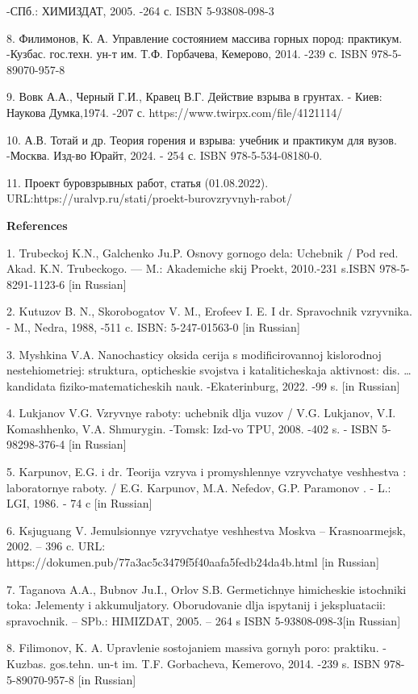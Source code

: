 -СПб.: ХИМИЗДАТ, 2005. -264 с. ISBN 5-93808-098-3

8. Филимонов, К. А. Управление состоянием массива горных пород:
практикум. -Кузбас. гос.техн. ун-т им. Т.Ф. Горбачева, Кемерово, 2014.
-239 с. ISBN 978-5-89070-957-8

9. Вовк А.А., Черный Г.И., Кравец В.Г. Действие взрыва в грунтах. -
Киев: Наукова Думка,1974. -207 с. https://www.twirpx.com/file/4121114/

10. А.В. Тотай и др. Теория горения и взрыва: учебник и практикум для
вузов. -Москва. Изд-во Юрайт, 2024. - 254 с. ISBN 978-5-534-08180-0.

11. Проект буровзрывных работ, статья (01.08.2022).
URL:https://uralvp.ru/stati/proekt-burovzryvnyh-rabot/

{\bfseries References}

1. Trubeckoj K.N., Galchenko Ju.P. Osnovy gornogo dela: Uchebnik / Pod
red. Akad. K.N. Trubeckogo. --- M.: Akademiche skij Proekt, 2010.-231
s.ISBN 978-5-8291-1123-6 {[}in Russian{]}

2. Kutuzov B. N., Skorobogatov V. M., Erofeev I. E. I dr. Spravochnik
vzryvnika. - M., Nedra, 1988, -511 c. ISBN: 5-247-01563-0 {[}in
Russian{]}

3. Myshkina V.A. Nanochasticy oksida cerija s modificirovannoj
kislorodnoj nestehiometriej: struktura, opticheskie svojstva i
kataliticheskaja aktivnost\textquotesingle: dis. \ldots{} kandidata
fiziko-matematicheskih nauk. -Ekaterinburg, 2022. -99 s. {[}in
Russian{]}

4. Luk\textquotesingle janov V.G. Vzryvnye raboty: uchebnik dlja vuzov /
V.G. Luk\textquotesingle janov, V.I. Komashhenko, V.A. Shmurygin.
-Tomsk: Izd-vo TPU, 2008. -402 s. - ISBN 5-98298-376-4 {[}in Russian{]}

5. Karpunov, E.G. i dr. Teorija vzryva i promyshlennye vzryvchatye
veshhestva : laboratornye raboty. / E.G. Karpunov, M.A. Nefedov, G.P.
Paramonov . - L.: LGI, 1986. - 74 c {[}in Russian{]}

6. Ksjuguang V. Jemul\textquotesingle sionnye vzryvchatye veshhestva
Moskva -- Krasnoarmejsk, 2002. -- 396 c. URL:
https://dokumen.pub/77a3ac5c3479f5f40aafa5fedb24da4b.html {[}in
Russian{]}

7. Taganova A.A., Bubnov Ju.I., Orlov S.B. Germetichnye himicheskie
istochniki toka: Jelementy i akkumuljatory. Oborudovanie dlja ispytanij
i jekspluatacii: spravochnik. -- SPb.: HIMIZDAT, 2005. -- 264 s ISBN
5-93808-098-3{[}in Russian{]}

8. Filimonov, K. A. Upravlenie sostojaniem massiva gornyh poro:
praktiku. -Kuzbas. gos.tehn. un-t im. T.F. Gorbacheva, Kemerovo, 2014.
-239 s. ISBN 978-5-89070-957-8 {[}in Russian{]}

